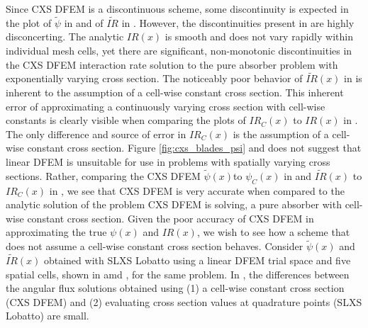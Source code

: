 Since CXS DFEM is a discontinuous scheme, some discontinuity is expected in the plot of $\widetilde{\psi}$ in  and of $\widetilde{IR}$ in . 
However, the discontinuities present in  are highly disconcerting.
The analytic $IR(x)$ is smooth and does not vary rapidly within individual mesh cells, yet there are significant, non-monotonic discontinuities in the CXS DFEM interaction rate solution to the pure absorber problem with exponentially varying cross section.
The noticeably poor behavior of $\widetilde{IR}(x)$ in  is inherent to the assumption of a cell-wise constant cross section.
This inherent error of approximating a continuously varying cross section with cell-wise constants is clearly visible when comparing the plots of $IR_C(x)$ to $IR(x)$ in .
The only difference and source of error in $IR_C(x)$ is the assumption of a cell-wise constant cross section.
Figure \ref{fig:cxs_blades_psi} and  does not suggest that linear DFEM is unsuitable for use in problems with spatially varying cross sections. 
Rather, comparing the CXS DFEM $\widetilde{\psi}(x)$to $\psi_C(x)$ in  and $\widetilde{IR}(x)$ to $IR_C(x)$ in , we see that CXS DFEM  is very accurate when compared to the analytic solution of the problem CXS DFEM is solving, a pure absorber with cell-wise constant cross section.
%
Given the poor accuracy of CXS DFEM in approximating the true $\psi(x)$ and $IR(x)$, we wish to see how a scheme that does not assume a cell-wise constant cross section behaves.
Consider $\widetilde{\psi}(x)$ and $\widetilde{IR}(x)$ obtained with SLXS Lobatto using a linear DFEM trial space and five spatial cells, shown in  amd , for the same problem.  
In , the differences between the angular flux solutions obtained using (1) a cell-wise constant cross section (CXS DFEM) and (2) evaluating cross section values at quadrature points (SLXS Lobatto) are small.
